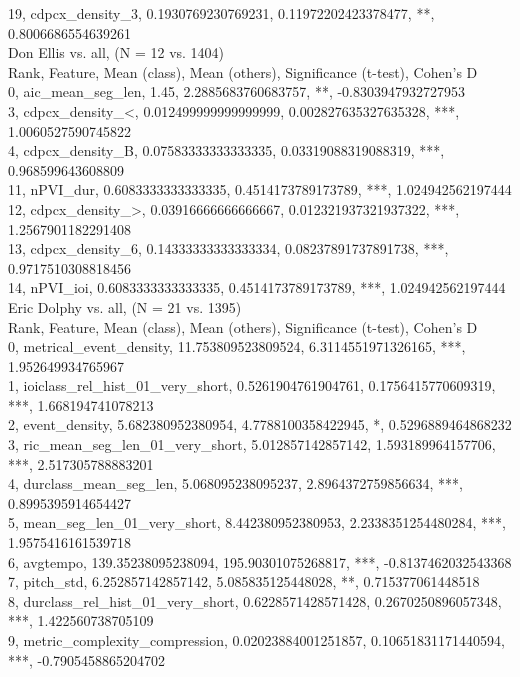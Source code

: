19, cdpcx_density_3, 0.1930769230769231, 0.11972202423378477, **, 0.8006686554639261\\
Don Ellis vs. all, (N = 12 vs. 1404)\\
Rank, Feature, Mean (class), Mean (others), Significance (t-test), Cohen's D\\
0, aic_mean_seg_len, 1.45, 2.2885683760683757, **, -0.8303947932727953\\
3, cdpcx_density_<, 0.012499999999999999, 0.002827635327635328, ***, 1.0060527590745822\\
4, cdpcx_density_B, 0.07583333333333335, 0.03319088319088319, ***, 0.968599643608809\\
11, nPVI_dur, 0.6083333333333335, 0.4514173789173789, ***, 1.024942562197444\\
12, cdpcx_density_>, 0.03916666666666667, 0.012321937321937322, ***, 1.2567901182291408\\
13, cdpcx_density_6, 0.14333333333333334, 0.08237891737891738, ***, 0.9717510308818456\\
14, nPVI_ioi, 0.6083333333333335, 0.4514173789173789, ***, 1.024942562197444\\
Eric Dolphy vs. all, (N = 21 vs. 1395)\\
Rank, Feature, Mean (class), Mean (others), Significance (t-test), Cohen's D\\
0, metrical_event_density, 11.753809523809524, 6.3114551971326165, ***, 1.952649934765967\\
1, ioiclass_rel_hist_01_very_short, 0.5261904761904761, 0.1756415770609319, ***, 1.668194741078213\\
2, event_density, 5.682380952380954, 4.7788100358422945, *, 0.5296889464868232\\
3, ric_mean_seg_len_01_very_short, 5.012857142857142, 1.593189964157706, ***, 2.517305788883201\\
4, durclass_mean_seg_len, 5.068095238095237, 2.8964372759856634, ***, 0.8995395914654427\\
5, mean_seg_len_01_very_short, 8.442380952380953, 2.2338351254480284, ***, 1.9575416161539718\\
6, avgtempo, 139.35238095238094, 195.90301075268817, ***, -0.8137462032543368\\
7, pitch_std, 6.252857142857142, 5.085835125448028, **, 0.715377061448518\\
8, durclass_rel_hist_01_very_short, 0.6228571428571428, 0.2670250896057348, ***, 1.422560738705109\\
9, metric_complexity_compression, 0.02023884001251857, 0.10651831171440594, ***, -0.7905458865204702\\
